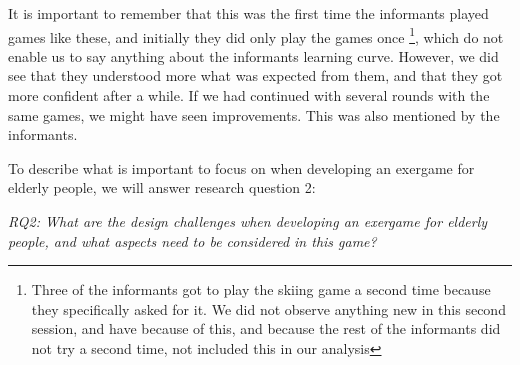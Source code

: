 It is important to remember that this was the first time the informants played games like these, and initially they did only play the games once \footnote{Three of the informants got to play the skiing game a second time because they specifically asked for it. We did not observe anything new in this second session, and have because of this, and because the rest of the informants did not try a second time, not included this in our analysis}, which do not enable us to say anything about the informants learning curve. However, we did see that they understood more what was expected from them, and that they got more confident after a while. If we had continued with several rounds with the same games, we might have seen improvements. This was also mentioned by the informants. 

To describe what is important to focus on when developing an exergame for elderly people, we will answer research question 2:

\emph{RQ2: What are the design challenges when developing an exergame for elderly people, and what aspects need to be considered in this game?}

